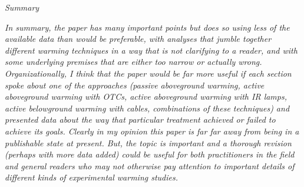 \documentclass[11pt,a4paper]{letter}
\begin{document}
\begin{letter}{}
\emph{Summary}

\emph{In summary, the paper has many important points but does so using less of the available data
than would be preferable, with analyses that jumble together different warming techniques in a
way that is not clarifying to a reader, and with some underlying premises that are either too
narrow or actually wrong. Organizationally, I think that the paper would be far more useful if
each section spoke about one of the approaches (passive aboveground warming, active
aboveground warming with OTCs, active aboveground warming with IR lamps, active
belowground warming with cables, combinations of these techniques) and presented data
about the way that particular treatment achieved or failed to achieve its goals. Clearly in my
opinion this paper is far far away from being in a publishable state at present. But, the topic is
important and a thorough revision (perhaps with more data added) could be useful for both
practitioners in the field and general readers who may not otherwise pay attention to
important details of different kinds of experimental warming studies.}



\end{letter}
\end{document}
